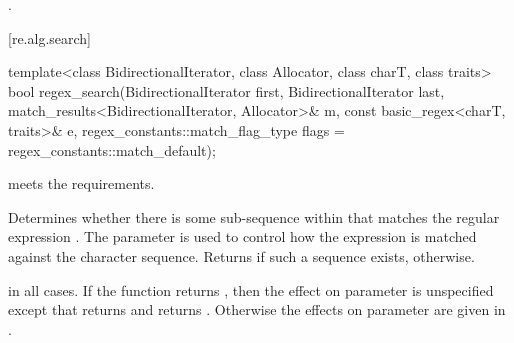 \begin{itemdescr}
\pnum
\returns
{}.
\end{itemdescr}

[re.alg.search]{}

%
\begin{itemdecl}
template<class BidirectionalIterator, class Allocator, class charT, class traits>
  bool regex_search(BidirectionalIterator first, BidirectionalIterator last,
                    match_results<BidirectionalIterator, Allocator>& m,
                    const basic_regex<charT, traits>& e,
                    regex_constants::match_flag_type flags = regex_constants::match_default);
\end{itemdecl}

\begin{itemdescr}
\pnum
\expects
{} meets the
 requirements.

\pnum
\effects
Determines whether there is some sub-sequence within  that matches
the regular expression . The parameter  is used to control how the
expression is matched against the character sequence. Returns  if such a sequence
exists,  otherwise.

\pnum
\ensures
{} in all cases.
If the function returns , then the effect
on parameter  is unspecified except that 
returns  and  returns .  Otherwise
the effects on parameter  are given in .
\end{itemdescr}

